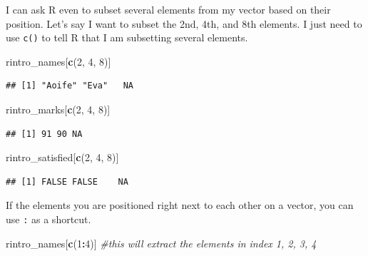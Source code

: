 \documentclass[
]{book}
\newenvironment{Shaded}{\begin{snugshade}}{\end{snugshade}}
\newcommand{\CommentTok}[1]{\textcolor[rgb]{0.56,0.35,0.01}{\textit{#1}}}
\newcommand{\DecValTok}[1]{\textcolor[rgb]{0.00,0.00,0.81}{#1}}
\newcommand{\FunctionTok}[1]{\textcolor[rgb]{0.13,0.29,0.53}{\textbf{#1}}}
\newcommand{\NormalTok}[1]{#1}
\newcommand{\SpecialCharTok}[1]{\textcolor[rgb]{0.81,0.36,0.00}{\textbf{#1}}}
\begin{document}
I can ask R even to subset several elements from my vector based on their position. Let's say I want to subset the 2nd, 4th, and 8th elements. I just need to use \texttt{c()} to tell R that I am subsetting several elements.

\begin{Shaded}
\begin{Highlighting}[]
\NormalTok{rintro\_names[}\FunctionTok{c}\NormalTok{(}\DecValTok{2}\NormalTok{, }\DecValTok{4}\NormalTok{, }\DecValTok{8}\NormalTok{)]}
\end{Highlighting}
\end{Shaded}

\begin{verbatim}
## [1] "Aoife" "Eva"   NA
\end{verbatim}

\begin{Shaded}
\begin{Highlighting}[]
\NormalTok{rintro\_marks[}\FunctionTok{c}\NormalTok{(}\DecValTok{2}\NormalTok{, }\DecValTok{4}\NormalTok{, }\DecValTok{8}\NormalTok{)]}
\end{Highlighting}
\end{Shaded}

\begin{verbatim}
## [1] 91 90 NA
\end{verbatim}

\begin{Shaded}
\begin{Highlighting}[]
\NormalTok{rintro\_satisfied[}\FunctionTok{c}\NormalTok{(}\DecValTok{2}\NormalTok{, }\DecValTok{4}\NormalTok{, }\DecValTok{8}\NormalTok{)]}
\end{Highlighting}
\end{Shaded}

\begin{verbatim}
## [1] FALSE FALSE    NA
\end{verbatim}

If the elements you are positioned right next to each other on a vector, you can use \texttt{:} as a shortcut.

\begin{Shaded}
\begin{Highlighting}[]
\NormalTok{rintro\_names[}\FunctionTok{c}\NormalTok{(}\DecValTok{1}\SpecialCharTok{:}\DecValTok{4}\NormalTok{)] }\CommentTok{\#this will extract the elements in index 1, 2, 3, 4}
\end{Highlighting}
\end{Shaded}
\end{document}
